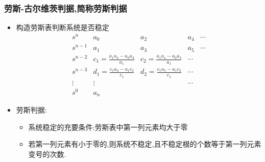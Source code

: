 \documentclass{article}
\begin{document}
\begin{frame}
\frametitle{劳斯-古尔维茨判据,简称劳斯判据}
\label{sec-2-2-3}

\begin{itemize}
\item <2->构造劳斯表判断系统是否稳定
      \begin{equation*}
      \begin{matrix}
      s^{n}   &  a_{0}  &  a_{2}  & a_{4}  & \cdots  \\
      s^{n-1} &  a_{1}  & a_{3}   & a_{5}  & \cdots  \\
      s^{n-2} &  c_{1}=\frac{a_1 a_2 - a_0 a_3}{a_1} &  c_{2}=\frac{a_1 a_4 - a_0 a_5}{a_1} & \cdots \\
      s^{n-3} &  d_{1}=\frac{c_1 a_3 - a_1 c_2}{c_1} &  d_{2}=\frac{c_1 a_5 - a_1 c_3}{c_1} & \cdots \\
      \vdots  &   \vdots                             &                                      & \cdots  \\
      s^{0}   &   a_{n}                              &                                      &
      \end{matrix}
      \end{equation*}
\item <3->劳斯判据:
\begin{itemize}
\item <4->系统稳定的充要条件:劳斯表中第一列元素均大于零
\item <5->若第一列元素有小于零的,则系统不稳定,且不稳定根的个数等于第一列元素变号的次数.
\end{itemize}
\end{itemize}
\end{frame}
\end{document}
